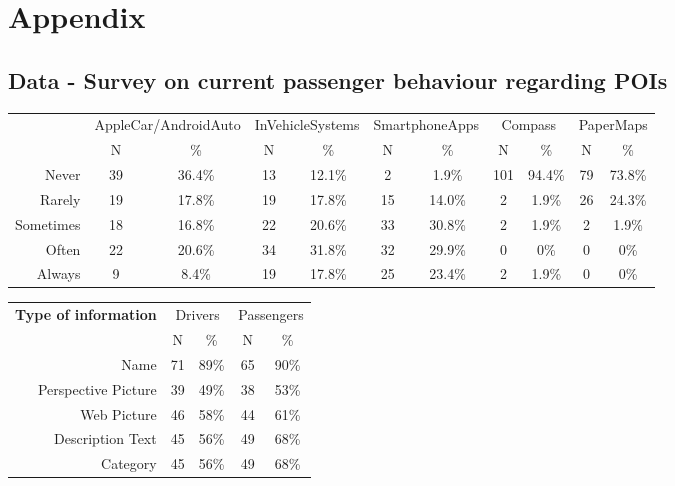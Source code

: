 \section{Appendix}
\subsection{Data - Survey on current passenger behaviour regarding POIs}

\begin{center}
    \begin{minipage}{\textwidth}

        \centering
        \begin{tabular}{r|cc|cc|cc|cc|cc}
            \toprule
            & \multicolumn{2}{c|}{AppleCar/AndroidAuto} & \multicolumn{2}{c|}{InVehicleSystems} & \multicolumn{2}{c|}{SmartphoneApps} & \multicolumn{2}{c|}{Compass} & \multicolumn{2}{c}{PaperMaps} \\
            & N & \% & N & \% & N & \% & N & \% & N & \% \\
            \midrule
            Never & 39 & 36.4\% & 13 & 12.1\% & 2 & 1.9\% & 101 & 94.4\% & 79 & 73.8\% \\
            Rarely & 19 & 17.8\% & 19 & 17.8\% & 15 & 14.0\% & 2 & 1.9\% & 26 & 24.3\% \\
            Sometimes & 18 & 16.8\% & 22 & 20.6\% & 33 & 30.8\% & 2 & 1.9\% & 2 & 1.9\% \\
            Often & 22 & 20.6\% & 34 & 31.8\% & 32 & 29.9\% & 0 & 0\% & 0 & 0\% \\
            Always & 9 & 8.4\% & 19 & 17.8\% & 25 & 23.4\% & 2 & 1.9\% & 0 & 0\% \\
            \bottomrule
        \end{tabular}

        \vspace{\baselineskip}
        
        \begin{tabular}{r|cc|cc}
            \toprule
            \textbf{Type of information} & \multicolumn{2}{c|}{Drivers} & \multicolumn{2}{c}{Passengers} \\
            & N & \% & N & \% \\
            \midrule
            Name & 71 & 89\% & 65 & 90\% \\
            Perspective Picture & 39 & 49\% & 38 & 53\% \\
            Web Picture & 46 & 58\% & 44 & 61\% \\
            Description Text & 45 & 56\% & 49 & 68\% \\
            Category & 45 & 56\% & 49 & 68\% \\
            \bottomrule
        \end{tabular}


\end{minipage}
\end{center}
